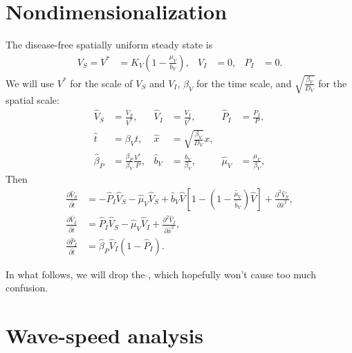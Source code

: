 \documentclass{jpmarticle}
\begin{document}
\section{Nondimensionalization}

The disease-free spatially uniform steady state is
\begin{align}
  V_S = V^* &= K_V \left(1 - \frac{\mu_V}{b_V}\right),
  &
  V_I &= 0,
  &
  P_I &= 0.
\end{align}
We will use $V^*$ for the scale of $V_S$ and $V_I$, $\beta_V$ for the
time scale, and $\sqrt{\frac{\beta_V}{D_V}}$ for the spatial scale:
\begin{equation}
  \begin{aligned}
    \hat{V}_S &= \frac{V_S}{V^*},
    &
    \hat{V}_I &= \frac{V_I}{V^*},
    &
    \hat{P}_I &= \frac{P_I}{P},
    \\
    \hat{t} &= \beta_V t,
    &
    \hat{x} &= \sqrt{\frac{\beta_V}{D_V}} x,
    \\
    \hat{\beta}_P &= \frac{\beta_P}{\beta_V}\frac{V^*}{P},
    &
    \hat{b}_V &= \frac{b_V}{\beta_V},
    &
    \hat{\mu}_V &= \frac{\mu_V}{\beta_V},
  \end{aligned}
\end{equation}
Then
\begin{equation}
  \label{pdesystem}
  \begin{split}
    \frac{\partial \hat{V}_S}{\partial \hat{t}}
    &= - \hat{P}_I \hat{V}_S
    - \hat{\mu}_V \hat{V}_S
    + \hat{b}_V \hat{V} \left[1 - \left(1 - \frac{\hat{\mu}_V}{\hat{b}_V}\right) \hat{V}\right]
    + \frac{\partial^2 \hat{V}_S}{\partial \hat{x}^2},
    \\
    \frac{\partial \hat{V}_I}{\partial \hat{t}}
    &= \hat{P}_I \hat{V}_S
    - \hat{\mu}_V \hat{V}_I
    + \frac{\partial^2 \hat{V}_I}{\partial \hat{x}^2},
    \\
    \frac{\partial \hat{P}_I}{\partial \hat{t}}
    &= \hat{\beta}_P \hat{V}_I (1 - \hat{P}_I).
  \end{split}
\end{equation}

In what follows, we will drop the $\hat{}$, which hopefully won't
cause too much confusion.

\section{Wave-speed analysis}
\end{document}
